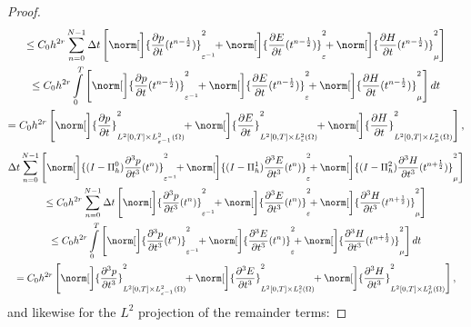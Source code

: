 \documentclass{amsart}
\theoremstyle{thmstyleone}%
\theoremstyle{thmstyletwo}%
\theoremstyle{thmstylethree}%
\begin{document}
\begin{proof}
\begin{multline*}
\le C_0 h^{2 r} \sum\limits_{n = 0}^{N-1} \Delta t \left[ \norm[\bigg]{\dfrac{\partial p}{\partial t}(t^{n - \frac{1}{2}})}^2_{\varepsilon^{-1}} \!\! + \norm[\bigg]{\dfrac{\partial E}{\partial t}(t^{n - \frac{1}{2}})}^2_{\varepsilon} \!\! + \norm[\bigg]{\dfrac{\partial H}{\partial t}(t^{n - \frac{1}{2}})}^2_{\mu} \right] \\
\le C_0 h^{2 r} \int\limits_0^T \left[ \norm[\bigg]{\dfrac{\partial p}{\partial t}(t^{n - \frac{1}{2}})}^2_{\varepsilon^{-1}} \!\! + \norm[\bigg]{\dfrac{\partial E}{\partial t}(t^{n - \frac{1}{2}})}^2_{\varepsilon} \!\! + \norm[\bigg]{\dfrac{\partial H}{\partial t}(t^{n - \frac{1}{2}})}^2_{\mu} \right] dt \\
= C_0 h^{2 r} \left[ \norm[\bigg]{\dfrac{\partial p}{\partial t}}^2_{L^2[0, T] \times L^2_{\varepsilon^{-1}}(\Omega)} \!\! + \norm[\bigg]{\dfrac{\partial E}{\partial t}}^2_{L^2[0, T] \times L^2_{\varepsilon}(\Omega)} \!\! + \norm[\bigg]{\dfrac{\partial H}{\partial t}}^2_{L^2[0, T] \times L^2_{\mu}(\Omega)} \right],
\end{multline*}
 \begin{multline*}
    \Delta t \sum\limits_{n = 0}^{N-1} \left[ \norm[\bigg]{(I - \Pi_h^0) \dfrac{\partial^3 p}{\partial t^3}(t^n)}^2_{\varepsilon^{-1}} \!\! + \norm[\bigg]{(I - \Pi_h^1) \dfrac{\partial^3 E}{\partial t^3}(t^n)}^2_{\varepsilon} \!\! + \norm[\bigg]{(I - \Pi_h^2) \dfrac{\partial^3 H}{\partial t^3}(t^{n + \frac{1}{2}})}^2_\mu \right] \\
\le C_0 h^{2 r} \sum\limits_{n = 0}^{N-1} \Delta t \left[ \norm[\bigg]{\dfrac{\partial^3 p}{\partial t^3}(t^n)}^2_{\varepsilon^{-1}} \!\! + \norm[\bigg]{\dfrac{\partial^3 E}{\partial t^3}(t^n)}^2_{\varepsilon} \!\! + \norm[\bigg]{\dfrac{\partial^3 H}{\partial t^3}(t^{n + \frac{1}{2}})}^2_{\mu} \right] \\
\le C_0 h^{2 r} \int\limits_0^T \left[ \norm[\bigg]{\dfrac{\partial^3 p}{\partial t^3}(t^n)}^2_{\varepsilon^{-1}} \!\! + \norm[\bigg]{\dfrac{\partial^3 E}{\partial t^3}(t^n)}^2_{\varepsilon} \!\! + \norm[\bigg]{\dfrac{\partial^3 H}{\partial t^3}(t^{n + \frac{1}{2}})}^2_{\mu} \right] dt \\
= C_0 h^{2 r} \left[ \norm[\bigg]{\dfrac{\partial^3 p}{\partial t^3}}^2_{L^2[0, T] \times L^2_{\varepsilon^{-1}}(\Omega)} \!\! + \norm[\bigg]{\dfrac{\partial^3 E}{\partial t^3}}^2_{L^2[0, T] \times L^2_{\varepsilon}(\Omega)} \!\! + \norm[\bigg]{\dfrac{\partial^3 H}{\partial t^3}}^2_{L^2[0, T] \times L^2_{\mu}(\Omega)} \right],
\end{multline*}
and likewise for the $L^2$ projection of the remainder terms:

\end{proof}
\end{document}
